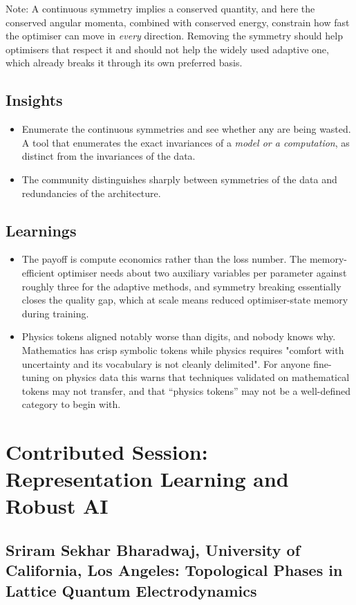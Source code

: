 \documentclass[11pt]{article}
\begin{document}
Note: A continuous symmetry implies a conserved quantity, and here the conserved angular momenta, combined with conserved energy, constrain how fast the optimiser can move in \emph{every} direction. Removing the symmetry should help optimisers that respect it and should not help the widely used adaptive one, which already breaks it through its own preferred basis.

\subsection*{Insights}
\begin{itemize}
    \item Enumerate the continuous symmetries and see whether any are being wasted. A tool that enumerates the exact invariances of a \emph{model or a computation}, as distinct from the invariances of the data.
    \item The community distinguishes sharply between symmetries of the data and redundancies of the architecture.
\end{itemize}

\subsection*{Learnings}
\begin{itemize}
    \item The payoff is compute economics rather than the loss number. The memory-efficient optimiser needs about two auxiliary variables per parameter against roughly three for the adaptive methods, and symmetry breaking essentially closes the quality gap, which at scale means reduced optimiser-state memory during training.
    \item Physics tokens aligned notably worse than digits, and nobody knows why. Mathematics has crisp symbolic tokens while physics requires "comfort with uncertainty and its vocabulary is not cleanly delimited". For anyone fine-tuning on physics data this warns that techniques validated on mathematical tokens may not transfer, and that ``physics tokens'' may not be a well-defined category to begin with.
\end{itemize}

\section{Contributed Session: Representation Learning and Robust AI}

\subsection*{Sriram Sekhar Bharadwaj, University of California, Los Angeles: Topological Phases in Lattice Quantum Electrodynamics}
\end{document}
